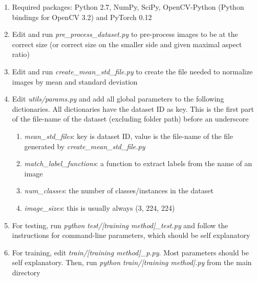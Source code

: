 \begin{enumerate}
    \item Required packages: Python 2.7, NumPy, SciPy, OpenCV-Python
    (Python bindings for OpenCV 3.2) and PyTorch 0.12
    \item Edit and run \emph{pre\_process\_dataset.py} to pre-process
    images to be at the correct size (or correct size on the smaller
    side and given maximal aspect ratio)
    \item Edit and run \emph{create\_mean\_std\_file.py} to create the
    file needed to normalize images by mean and standard deviation
    \item Edit \emph{utils/params.py} and add all global parameters
    to the following dictionaries. All dictionaries have the dataset
    ID as key. This is the first part of the file-name of the dataset
    (excluding folder path) before an underscore
    \begin{enumerate}
        \item \emph{mean\_std\_files}: key is dataset ID, value is the file-name
        of the file generated by \emph{create\_mean\_std\_file.py}
        \item \emph{match\_label\_functions}: a function to extract labels
        from the name of an image
        \item \emph{num\_classes}: the number of classes/instances in the dataset
        \item \emph{image\_sizes}: this is usually always (3, 224, 224)
    \end{enumerate}
    \item For testing, run \emph{python test/[training method]\_test.py} and
    follow the instructions for command-line parameters, which should be self
    explanatory
    \item For training, edit \emph{train/[training method]\_p.py}.
    Most parameters should be self explanatory. Then, run
    \emph{python train/[training method].py} from the main directory
\end{enumerate}

